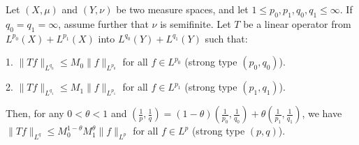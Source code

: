 \begin{theorem}
    
Let $(X, \mu)$ and $(Y, \nu)$ be two measure spaces, and let $1 \leqslant p_0, p_1, q_0, q_1 \leqslant \infty$. If $q_0 = q_1 = \infty$, assume further that $\nu$ is semifinite. Let $T$ be a linear operator from $L^{p_0}(X) + L^{p_1}(X)$ into $L^{q_0}(Y) + L^{q_1}(Y)$ such that:

1. $\|Tf\|_{L^{q_0}} \leqslant M_0\|f\|_{L^{p_0}}$ for all $f \in L^{p_0}$ (strong type $(p_0, q_0)$).

2. $\|Tf\|_{L^{q_1}} \leqslant M_1\|f\|_{L^{p_1}}$ for all $f \in L^{p_1}$ (strong type $(p_1, q_1)$).

Then, for any $0 < \theta < 1$ and $\left(\frac{1}{p}, \frac{1}{q}\right) = (1-\theta)\left(\frac{1}{p_0}, \frac{1}{q_0}\right) + \theta\left(\frac{1}{p_1}, \frac{1}{q_1}\right)$, we have $\|Tf\|_{L^q} \leqslant M_0^{1-\theta}M_1^\theta\|f\|_{L^p}$ for all $f \in L^p$ (strong type $(p, q)$).
\end{theorem}